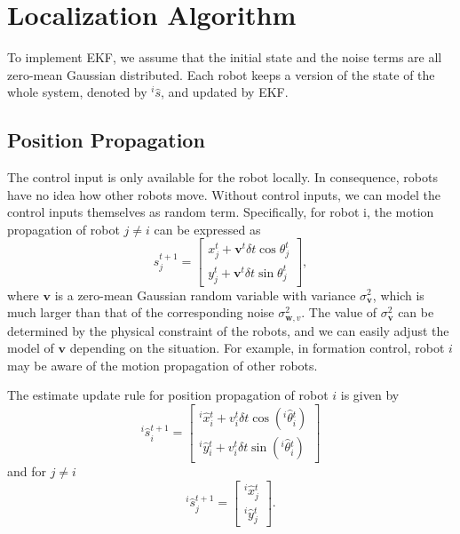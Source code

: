 \documentclass[xcolor=x11names]{article}
\begin{document}
\section{Localization Algorithm}

   To implement EKF, we assume that the initial state and the noise terms are all zero-mean Gaussian distributed.
   Each robot keeps a version of the state of the whole system, denoted by $^i\hat{s}$, and updated by EKF.

\subsection{Position Propagation}

   The control input is only available for the robot locally. In consequence, robots have no idea how other robots move. Without control inputs, we can model the control inputs themselves as random term. Specifically, for robot i, the motion propagation of robot $j\neq i$ can be expressed as
   \begin{equation}
      s^{t+1}_{j} =
      \begin{bmatrix} 
         x^{t}_{j} +  \mathbf{v}^t \delta t  \cos\theta^{t}_{j} \\  y^{t}_{j} + \mathbf{v}^t \delta t \sin\theta^{t}_{j} 
      \end{bmatrix},
   \end{equation}   
   where $\mathbf{v}$ is a zero-mean Gaussian random variable with variance $\sigma_{\mathbf{v}}^2$, which is much larger than that of the corresponding noise  $\sigma_{\mathbf{w},v}^2$. The value of $\sigma_{\mathbf{v}}^2$ can be determined by the physical constraint of the robots, and we can easily adjust the model of $\mathbf{v}$ depending on the situation. For example, in formation control, robot $i$ may be aware of the motion propagation of other robots.


   The estimate update rule for position propagation of robot $i$ is given by
   \begin{equation}
      ^i\hat{s}_i^{t+1} = 
      \begin{bmatrix} 
         ^i{\hat{x}}{_i^{t}} +  v^t_{i} \delta t\cos(^i{\hat{\theta}}{_i^{t}})  \\  
         ^i{\hat{y}}{_i^{t}} + v^t_{i} \delta t \sin(^i{\hat{\theta}}{_i^{t}})   
      \end{bmatrix}
   \end{equation}   
and for $j \neq i$
   \begin{equation}
      ^i{\hat{s}}{_j^{t+1}} = 
      \begin{bmatrix} 
         ^i{\hat{x}}{_j^{t}}  \\  
         ^i{\hat{y}}{_j^{t}} 
      \end{bmatrix}.
   \end{equation} 
\end{document}
